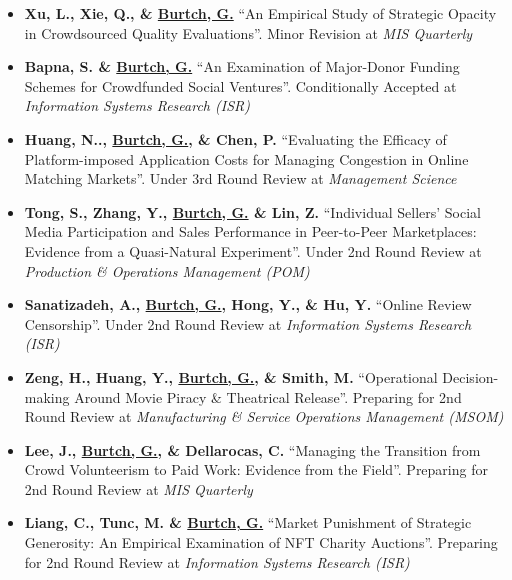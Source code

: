 \documentclass[10.5pt,letterpaper,sans]{moderncv}        %
\begin{document}
\begin{itemize}[leftmargin=!,labelindent=5pt,itemindent=-15pt]

\item \textbf{Xu, L., Xie, Q., \& \underline{Burtch, G.}} ``An Empirical Study of Strategic Opacity in Crowdsourced Quality Evaluations''. Minor Revision at \textit{MIS Quarterly}

\item \textbf{Bapna, S. \& \underline{Burtch, G.}} ``An Examination of Major-Donor Funding Schemes for Crowdfunded Social Ventures''. Conditionally Accepted at \textit{Information Systems Research (ISR)}

\item \textbf{Huang, N.., \underline{Burtch, G.}, \& Chen, P.} ``Evaluating the Efficacy of Platform-imposed Application Costs for Managing Congestion in Online Matching Markets''. Under 3rd Round Review at \textit{Management Science} 

\item \textbf{Tong, S., Zhang, Y.,  \underline{Burtch, G.} \& Lin, Z.} ``Individual Sellers' Social Media Participation and Sales Performance in Peer-to-Peer Marketplaces: Evidence from a Quasi-Natural Experiment''. Under 2nd Round Review at \textit{Production \& Operations Management (POM)} 

\item \textbf{Sanatizadeh, A., \underline{Burtch, G.}, Hong, Y., \& Hu, Y.} ``Online Review Censorship''. Under 2nd Round Review at \textit{Information Systems Research (ISR)}

\item \textbf{Zeng, H., Huang, Y., \underline{Burtch, G.}, \& Smith, M.} ``Operational Decision-making Around Movie Piracy \& Theatrical Release''. Preparing for 2nd Round Review at \textit{Manufacturing \& Service Operations Management (MSOM)}

\item \textbf{Lee, J., \underline{Burtch, G.}, \& Dellarocas, C.} ``Managing the Transition from Crowd Volunteerism to Paid Work: Evidence from the Field''. Preparing for 2nd Round Review at \textit{MIS Quarterly}

\item \textbf{Liang, C., Tunc, M. \& \underline{Burtch, G.}} ``Market Punishment of Strategic Generosity: An Empirical Examination of NFT Charity Auctions''. Preparing for 2nd Round Review at \textit{Information Systems Research (ISR)}

\end{itemize}
\end{document}

